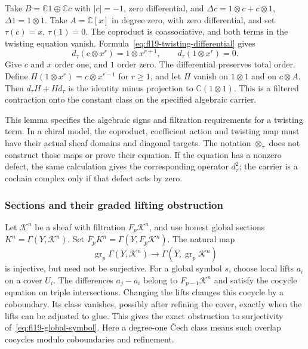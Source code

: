 \begin{example}\label{ex:fl20-twisted-polynomial}
Take $B=\mathbb C1\oplus\mathbb Cc$ with $|c|=-1$, zero differential, and
$\Delta c=1\otimes c+c\otimes1$, $\Delta1=1\otimes1$.
Take $A=\mathbb C[x]$ in degree zero, with zero differential, and set $\tau(c)=x$, $\tau(1)=0$.
The coproduct is coassociative, and both terms in the twisting equation vanish.
Formula~\eqref{eq:fl19-twisting-differential} gives
\[
d_\tau(c\otimes x^r)=1\otimes x^{r+1},
\qquad d_\tau(1\otimes x^r)=0.
\]
Give $c$ and $x$ order one, and $1$ order zero.
The differential preserves total order.
Define $H(1\otimes x^r)=c\otimes x^{r-1}$ for $r\ge1$, and let $H$ vanish on $1\otimes1$ and on $c\otimes A$.
Then $d_\tau H+Hd_\tau$ is the identity minus projection to $\mathbb C(1\otimes1)$.
This is a filtered contraction onto the constant class on the specified algebraic carrier.
\end{example}

This lemma specifies the algebraic signs and filtration requirements for a twisting term.
In a chiral model, the coproduct, coefficient action and twisting map must have their actual sheaf domains and diagonal targets.
The notation $\otimes_\tau$ does not construct those maps or prove their equation.
If the equation has a nonzero defect, the same calculation gives the corresponding operator $d_\tau^2$; the carrier is a cochain complex only if that defect acts by zero.

\subsubsection{Sections and their graded lifting obstruction}

Let $\mathcal K^n$ be a sheaf with filtration $F_p\mathcal K^n$, and use honest global sections
$K^n=\Gamma(Y,\mathcal K^n)$.
Set $F_pK^n=\Gamma(Y,F_p\mathcal K^n)$.
The natural map
\begin{equation}\label{eq:fl19-global-symbol}
\operatorname{gr}_p\Gamma(Y,\mathcal K^n)
\longrightarrow\Gamma(Y,\operatorname{gr}_p\mathcal K^n)
\end{equation}
is injective, but need not be surjective.
For a global symbol $s$, choose local lifts $a_i$ on a cover $U_i$.
The differences $a_j-a_i$ belong to $F_{p-1}\mathcal K^n$ and satisfy the cocycle equation on triple intersections.
Changing the lifts changes this cocycle by a coboundary.
Its class vanishes, possibly after refining the cover, exactly when the lifts can be adjusted to glue.
This gives the exact obstruction to surjectivity of~\eqref{eq:fl19-global-symbol}.
Here a degree-one \v Cech class means such overlap cocycles modulo coboundaries and refinement.

